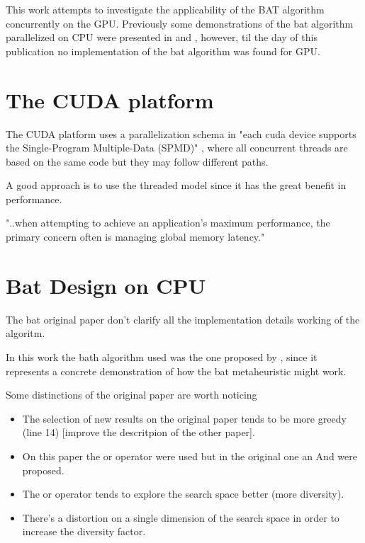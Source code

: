 \documentclass[conference]{IEEEtran}
\begin{document}
This work attempts to investigate the applicability of the BAT algorithm
concurrently on the GPU. Previously some demonstrations of the bat
algorithm parallelized on CPU were presented in \cite{paralellCPUFirst}
and \cite{paralellCPU}, however, til the day of this publication no
implementation of the bat algorithm was found for GPU. 

\section{The CUDA platform}

The CUDA platform uses a parallelization schema in "each cuda
device supports the Single-Program Multiple-Data (SPMD)"
\cite{cuda_optimizations}, where all concurrent threads are based on the
same code but they may follow different paths.

A good approach is to use the threaded model since it has the great benefit in performance.

"..when attempting to achieve an application's maximum
performance, the primary concern often is managing global memory
latency." \cite{cuda_optimizations}

\section{Bat Design on CPU}

The bat original paper don't clarify  all the implementation details working of the algoritm.

In this work the bath algorithm used was the one proposed by
\autocite{Jelson et al.}, since it represents a concrete demonstration of how
the bat metaheuristic might work.

Some distinctions of the original paper are worth noticing

\begin{itemize}
    \item The selection of new results on the original paper tends to be more greedy (line 14) [improve the descritpion of the other paper].
    \item On this paper the or operator were used but in the original one an And were proposed.
    \item The or operator tends to explore the search space better (more diversity).

    \item There's a distortion on a single dimension of the search space in
order to increase the diversity factor.
\end{itemize}
\end{document}
